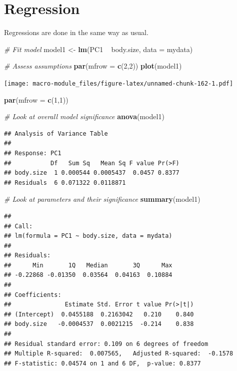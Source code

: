 \documentclass[]{book}
\newenvironment{Shaded}{\begin{snugshade}}{\end{snugshade}}
\newcommand{\KeywordTok}[1]{\textcolor[rgb]{0.13,0.29,0.53}{\textbf{{#1}}}}
\newcommand{\DataTypeTok}[1]{\textcolor[rgb]{0.13,0.29,0.53}{{#1}}}
\newcommand{\DecValTok}[1]{\textcolor[rgb]{0.00,0.00,0.81}{{#1}}}
\newcommand{\StringTok}[1]{\textcolor[rgb]{0.31,0.60,0.02}{{#1}}}
\newcommand{\CommentTok}[1]{\textcolor[rgb]{0.56,0.35,0.01}{\textit{{#1}}}}
\newcommand{\NormalTok}[1]{{#1}}
\theoremstyle{definition}
\theoremstyle{definition}
\theoremstyle{definition}
\theoremstyle{remark}
\begin{document}
\section{Regression}\label{regression}

Regressions are done in the same way as usual.

\begin{Shaded}
\begin{Highlighting}[]
\CommentTok{# Fit model}
\NormalTok{model1 <-}\StringTok{ }\KeywordTok{lm}\NormalTok{(PC1 ~}\StringTok{ }\NormalTok{body.size, }\DataTypeTok{data =} \NormalTok{mydata)}

\CommentTok{# Assess assumptions}
\KeywordTok{par}\NormalTok{(}\DataTypeTok{mfrow =} \KeywordTok{c}\NormalTok{(}\DecValTok{2}\NormalTok{,}\DecValTok{2}\NormalTok{))}
\KeywordTok{plot}\NormalTok{(model1)}
\end{Highlighting}
\end{Shaded}

\texttt{[image: macro-module\_files/figure-latex/unnamed-chunk-162-1.pdf]}

\begin{Shaded}
\begin{Highlighting}[]
\KeywordTok{par}\NormalTok{(}\DataTypeTok{mfrow =} \KeywordTok{c}\NormalTok{(}\DecValTok{1}\NormalTok{,}\DecValTok{1}\NormalTok{))}

\CommentTok{# Look at overall model significance}
\KeywordTok{anova}\NormalTok{(model1)}
\end{Highlighting}
\end{Shaded}

\begin{verbatim}
## Analysis of Variance Table
## 
## Response: PC1
##           Df   Sum Sq   Mean Sq F value Pr(>F)
## body.size  1 0.000544 0.0005437  0.0457 0.8377
## Residuals  6 0.071322 0.0118871
\end{verbatim}

\begin{Shaded}
\begin{Highlighting}[]
\CommentTok{# Look at parameters and their significance}
\KeywordTok{summary}\NormalTok{(model1)}
\end{Highlighting}
\end{Shaded}

\begin{verbatim}
## 
## Call:
## lm(formula = PC1 ~ body.size, data = mydata)
## 
## Residuals:
##      Min       1Q   Median       3Q      Max 
## -0.22868 -0.01350  0.03564  0.04163  0.10884 
## 
## Coefficients:
##               Estimate Std. Error t value Pr(>|t|)
## (Intercept)  0.0455188  0.2163042   0.210    0.840
## body.size   -0.0004537  0.0021215  -0.214    0.838
## 
## Residual standard error: 0.109 on 6 degrees of freedom
## Multiple R-squared:  0.007565,   Adjusted R-squared:  -0.1578 
## F-statistic: 0.04574 on 1 and 6 DF,  p-value: 0.8377
\end{verbatim}
\end{document}
